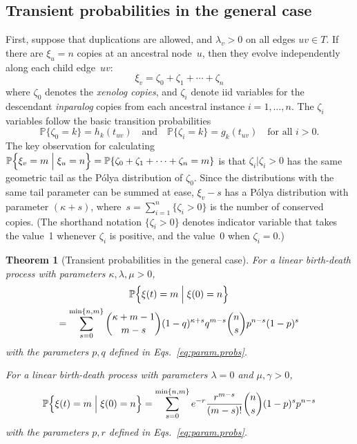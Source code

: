\documentclass{elsarticle}
\newcommand{\condgen}[6]{{#1}#2 #5 #3 #6 #4}
\newcommand{\PROB}{\mathbb{P}}
\newcommand{\Probcmd}[2]{\condgen{\PROB}{\Bigl\{}{\Bigm|}{\Bigr\}}{#1}{#2}}
\newtheorem{theorem}{Theorem}
\newcommand{\nx}{u}
\newcommand{\ny}{v}
\begin{document}
\subsection{Transient probabilities in the general case}
First, suppose that duplications are allowed, and $\lambda_{\ny}>0$ on all edges $\nx\ny\in T$. 
If there are $\xi_{\nx}=n$ copies 
at an ancestral node~$\nx$, then they evolve independently along
each child edge~$\nx\ny$:
\begin{equation}\label{eq:groups.rv}
\xi_{\ny} = \zeta_0 + \zeta_1 + \dotsm + \zeta_n
\end{equation}
where $\zeta_0$ denotes 
the {\em xenolog copies}, 
and $\zeta_i$ denote iid variables for the descendant 
{\em inparalog} copies 
from each ancestral instance $i=1,\dotsc, n$.  
The $\zeta_i$ variables 
follow the basic transition probabilities 
\[
\PROB\{\zeta_0=k\} = h_k(t_{\nx\ny})
\quad\text{and}\quad
\PROB\{\zeta_i=k\} = g_k(t_{\nx\ny})
	\quad \text{for all $i>0$.}
\]
The key observation for calculating 
$\Probcmd{\xi_{\ny}=m}{\xi_{\nx}=n} = \PROB\{\zeta_0+\zeta_1+\dotsm + \zeta_n=m\}$
is that $\zeta_i|\zeta_i>0$ 
has the same geometric tail as the P{\'o}lya distribution 
of $\zeta_0$.  
Since the distributions with the same tail parameter can be summed
at ease, $\xi_{\ny}-s$ has a P{\'o}lya distribution 
with parameter $(\kappa+s)$, where~$s=\sum_{i=1}^n\{\zeta_i>0\}$ is the 
number of conserved copies.
(The shorthand notation $\{\zeta_i>0\}$ denotes indicator variable  that takes 
the value~1
whenever $\zeta_i$ is positive, and the value~0 when $\zeta_i=0$.)   


\begin{theorem}[Transient probabilities in the general case]\label{tm:transition}
For a linear birth-death process with parameters $\kappa,\lambda,\mu>0$, 
\begin{multline}
\Probcmd{\xi(t)=m}{\xi(0)=n} 
\\
	= \sum_{s=0}^{\min\{n,m\}}
		\binom{\kappa + m-1}{m-s} (1-q)^{\kappa+s} q^{m-s} \binom{n}{s}p^{n-s}(1-p)^s
\end{multline}
with the parameters $p,q$ defined in Eqs.~\eqref{eq:param.probs}.

For a linear birth-death process with parameters $\lambda=0$ and $\mu,\gamma>0$, 
\begin{equation}
\Probcmd{\xi(t)=m}{\xi(0)=n} 
	= \sum_{s=0}^{\min\{n,m\}}
		e^{-r} \frac{r^{m-s}}{(m-s)!} \binom{n}{s} (1-p)^s p^{n-s}
\end{equation}
with the parameters $p,r$ defined in Eqs.~\eqref{eq:param.probs}.
\end{theorem}
\end{document}
